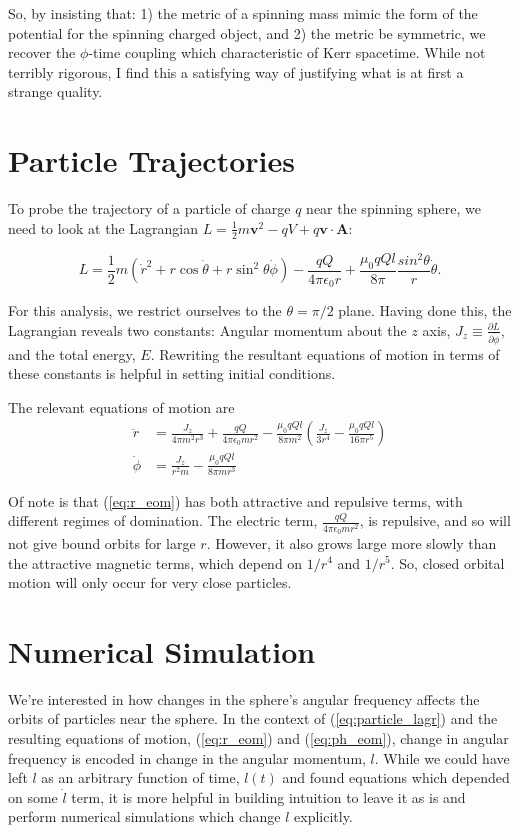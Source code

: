\documentclass[11pt]{article}
\begin{document}
So, by insisting that: 1) the metric of a spinning mass mimic the form of the potential for the spinning charged object, and 2) the metric be symmetric, we recover the $\phi$-time coupling which characteristic of Kerr spacetime.  While not terribly rigorous, I find this a satisfying way of justifying what is at first a strange quality.

\section{Particle Trajectories}
To probe the trajectory of a particle of charge $q$ near the spinning sphere, we need to look at the Lagrangian $L = \frac{1}{2}m\mathbf{v}^2 - qV + q\mathbf{v}\cdot\mathbf{A}$:

\begin{equation}\label{eq:particle_lagr}
L = \frac{1}{2}m\left(\dot{r}^2 + r\cos\dot{\theta} + r\sin^2\theta\dot{\phi}\right) - \frac{qQ}{4\pi\epsilon_0r} + \frac{\mu_0qQl}{8\pi}\frac{sin^2\theta}{r}\dot{\theta}.
\end{equation}
 
For this analysis, we restrict ourselves to the $\theta = \pi/2$ plane.  Having done this, the Lagrangian reveals two constants:  Angular momentum about the $z$ axis, $J_z \equiv \frac{\partial L}{\partial \dot{\phi}}$, and the total energy, $E$.  Rewriting the resultant equations of motion in terms of these constants is helpful in setting initial conditions.

The relevant equations of motion are
\begin{align}
\ddot{r} &= \frac{J_z}{4\pi m^2 r^3} + \frac{qQ}{4\pi\epsilon_0 m r^2} - \frac{\mu_0 q Q l}{8 \pi m^2}\left(\frac{J_z}{3r^4} - \frac{\mu_0 q Q l}{16\pi r^5}\right)\label{eq:r_eom}\\
\dot{\phi} &= \frac{J_z}{r^2m} - \frac{\mu_0qQl}{8\pi m r^3}\label{eq:ph_eom}
\end{align}

Of note is that (\ref{eq:r_eom}) has both attractive and repulsive terms, with different regimes of domination.  The electric term, $\frac{qQ}{4\pi\epsilon_0 m r^2}$, is repulsive, and so will not give bound orbits for large $r$.  However, it also grows large more slowly than the attractive magnetic terms, which depend on $1/r^4$ and $1/r^5$.  So, closed orbital motion will only occur for very close particles.

\section{Numerical Simulation}
We're interested in how changes in the sphere's angular frequency affects the orbits of particles near the sphere.  In the context of (\ref{eq:particle_lagr}) and the resulting equations of motion, (\ref{eq:r_eom}) and (\ref{eq:ph_eom}), change in angular frequency is encoded in change in the angular momentum, $l$.  While we could have left $l$ as an arbitrary function of time, $l(t)$ and found equations which depended on some $\dot{l}$ term, it is more helpful in building intuition to leave it as is and perform numerical simulations which change $l$ explicitly.
\end{document}
